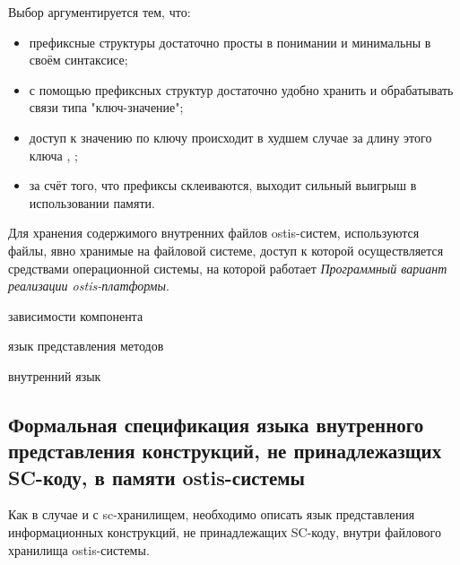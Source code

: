 Выбор аргументируется тем, что:
\begin{itemize}
    \item префиксные структуры достаточно просты в понимании и минимальны в своём синтаксисе;
    \item с помощью префиксных структур достаточно удобно хранить и обрабатывать связи типа "ключ-значение";
    \item доступ к значению по ключу происходит в худшем случае за длину этого ключа \cite{tsuruta2022cPrefixTree}, \cite{belazzougui2010fastPrefixTree};
    \item за счёт того, что префиксы склеиваются, выходит сильный выигрыш в использовании памяти.
\end{itemize}

Для хранения содержимого внутренних файлов ostis-систем, используются файлы, явно хранимые на файловой системе, доступ к которой осуществляется средствами операционной системы, на которой работает \textit{Программный вариант реализации ostis-платформы}.

\begin{SCn}
\begin{scnrelfromset}{зависимости компонента}
\end{scnrelfromset}
\begin{scnrelfromlist}{язык представления методов}
\end{scnrelfromlist}
\begin{scnrelfromlist}{внутренний язык}
\end{scnrelfromlist}
\end{SCn}

\subsection{Формальная спецификация языка внутренного представления конструкций, не принадлежазщих SC-коду, в памяти ostis-системы}

Как в случае и с sc-хранилищем, необходимо описать язык представления информационных конструкций, не принадлежащих SC-коду, внутри файлового хранилища ostis-системы.


